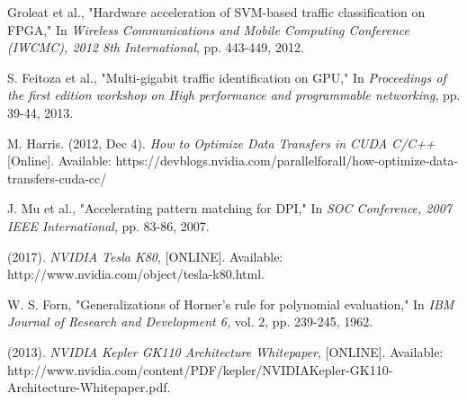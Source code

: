 \begin{thebibliography}{10}
 Groleat et al., "Hardware acceleration of SVM-based traffic classification on FPGA," In \textit{Wireless Communications and Mobile Computing Conference (IWCMC), 2012 8th International}, pp. 443-449, 2012.

 S. Feitoza et al., "Multi-gigabit traffic identification on GPU," In \textit{Proceedings of the first edition workshop on High performance and programmable networking}, pp. 39-44, 2013.

 M. Harris. (2012, Dec 4). \textit{How to Optimize Data Transfers in CUDA C/C++} [Online]. Available: https://devblogs.nvidia.com/parallelforall/how-optimize-data-transfers-cuda-cc/ 

 J. Mu et al., "Accelerating pattern matching for DPI," In \textit{SOC Conference, 2007 IEEE International}, pp. 83-86, 2007.

 (2017). \textit{NVIDIA Tesla K80}, [ONLINE]. Available: http://www.nvidia.com/object/tesla-k80.html.

 W. S. Forn, "Generalizations of Horner's rule for polynomial evaluation," In \textit{IBM Journal of Research and Development 6,} vol. 2, pp. 239-245, 1962.

(2013). \textit{NVIDIA Kepler GK110 Architecture Whitepaper}, [ONLINE]. Available: http://www.nvidia.com/content/PDF/kepler/NVIDIAKepler-GK110-Architecture-Whitepaper.pdf.


\end{thebibliography}
